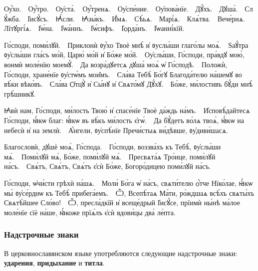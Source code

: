 \documentclass[11pt,a4paper,oneside]{memoir}
\begin{document}
    \begin{slv}
        Оу҆́хо.~\textemdash~Оу҆́тро.~\textemdash~Оу҆ста̀.~\textemdash~Оу҆́тренѧ.~\textemdash~Оу҆спе́ние.~\textemdash~Оу҆пова́нїе.~\textemdash~Дꙋ́хъ.~\textemdash~Дꙋша̀.~\textemdash~Слꙋ́жба.~\textemdash~І҆исꙋ́съ.~\textemdash~Ꙗ҆́сли.~\textemdash~Ꙗ҆зы́къ.~\textemdash~И҆́мѧ.~\textemdash~Сѣ́ьѧ.~\textemdash~Марі́ѧ.~\textemdash~Клѧ́тва.~\textemdash~Вече́рнѧ.~\textemdash~Лїтꙋргі́ѧ.~\textemdash~І҆ѡ́на.~\textemdash~І҆ѡа́ннъ.~\textemdash~І҆ѡ́сифъ.~\textemdash~І҆ѻрда́нъ.~\textemdash~І҆ѡанні́кїй.
        
        Го́споди, поми́лꙋй.~\textemdash~Приклонѝ ᲂу҆́хо Твоѐ мнѣ̀ и҆ ᲂуслы́ши глаго́лы моѧ̀.~\textemdash~Ѕаꙋ́тра ᲂу҆слы́ши гла́съ мо́й, Царю̀ мо́й и҆ Бо́же мо́й.~\textemdash~Оу҆слы́ши, Го́споди, пра́вдꙋ мою̀, вонмѝ моле́нїю моемꙋ̀.~\textemdash~Да возра́дꙋетсѧ дꙋша̀ моѧ̀ ѡ҆ Го́сподѣ.~\textemdash~Положѝ, Го́споди, хране́нїе ᲂу҆стѡ́мъ мои̑мъ.~\textemdash~Сла́ва Тебѣ̀ Бо́гꙋ Благода́телю на́шемꙋ во вѣ́ки вѣко́въ.~\textemdash~Сла́ва Ѻ҆тцꙋ̀ и҆ Сы́нꙋ и҆ Свѧто́мꙋ Дꙋ́хꙋ.~\textemdash~Бо́же, ми́лостивъ бꙋ́ди мнѣ̀ грѣ́шникꙋ.
        
        Ꙗ҆вѝ нам, Го́споди, ми́лость Твою̀ и҆ спасе́нїе Твоѐ да́ждь на́мъ.~\textemdash~И҆сповѣ́дайтесѧ Го́споди, ꙗ҆́кѡ благ: ꙗ҆́кѡ въ вѣ́къ ми́лость є҆гѡ́.~\textemdash~Да бꙋ́детъ во́лѧ твоѧ̀, ꙗ҆́кѡ на небесѝ и҆ на землѝ.~\textemdash~А҆́нгели, ᲂу҆спѣ́нїе Пречи́стыѧ ви́дѣвше, ᲂу҆диви́шасѧ.
        
        Благословѝ, дꙋшѐ моѧ̀, Го́спода.~\textemdash~Го́споди, воззва́хъ къ Тебѣ̀, ᲂу҆слы́ши мѧ̀.~\textemdash~Поми́лꙋй мѧ̀, Бо́же, поми́лꙋй мѧ̀.~\textemdash~Пресвѧта́ѧ Тро́ице, поми́лꙋй на́съ.~\textemdash~Свѧ́тъ, Свѧ́тъ, Свѧ́тъ є҆сѝ Бо́же, Богоро́дицею поми́лꙋй на́съ.
        
        Го́споди, ѡ҆чи́сти грѣхѝ на́шѧ.~\textemdash~Моли́ Бо́га ѡ҆ на́съ, свѧти́телю ѻ҆́тче Нїко́лае, ꙗ҆́кѡ мы̀ ᲂу҆се́рднѡ къ Тебѣ̀ прибега́емъ.~\textemdash~Ѽ, Всепѣ́таѧ Ма́ти, ро́ждшаѧ всѣ́хъ свѧты́хъ Свѧтѣ́йшее Сло́во!~\textemdash~Ѽ, пресла́дкїй и҆ всеще́дрый І҆исꙋ́се, прїимѝ ны́нѣ ма́лое моле́нїе сїѐ на́ше, ꙗ҆́коже прїѧ́лъ є҆сѝ вдови́цы два̀ ле́пта.
    \end{slv}

                \subsubsection{Надстрочные знаки}

    В церковнославянском языке употребляются следующие надстрочные знаки: \textbf{ударения}, \textbf{придыхание} и \textbf{титла}.
\end{document}
